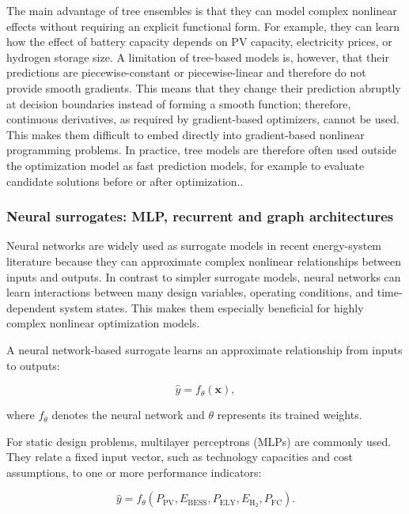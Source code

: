 \documentclass[final,5p,times,twocolumn]{elsarticle}
\begin{document}
The main advantage of tree ensembles is that they can model complex
nonlinear effects without requiring an explicit functional form. For
example, they can learn how the effect of battery capacity depends on PV
capacity, electricity prices, or hydrogen storage size. A limitation of
tree-based models is, however, that their predictions are
piecewise-constant or piecewise-linear and therefore do not provide
smooth gradients. This means that they change their prediction abruptly
at decision boundaries instead of forming a smooth function; therefore,
continuous derivatives, as required by gradient-based optimizers, cannot
be used. This makes them difficult to embed directly into gradient-based
nonlinear programming problems. In practice, tree models are therefore
often used outside the optimization model as fast prediction models, for
example to evaluate candidate solutions before or after
optimization.\cite{Ren2024,Lin2023,Pang2023,Wang20211767}.

\subsubsection{Neural surrogates: MLP, recurrent and graph architectures}
\label{sec:tax:nn}

Neural networks are widely used as surrogate models in recent
energy-system literature because they can approximate complex nonlinear
relationships between inputs and outputs. In contrast to simpler
surrogate models, neural networks can learn interactions between many
design variables, operating conditions, and time-dependent system
states. This makes them especially beneficial for highly complex
nonlinear optimization models.

A neural network-based surrogate learns an approximate relationship from
inputs to outputs:

$$\begin{equation}
 \hat{y} = f_{\theta}(\mathbf{x}),
\end{equation}$$

where $f_{\theta}$ denotes the neural network and $\theta$ represents
its trained weights.

For static design problems, multilayer perceptrons (MLPs) are commonly
used. They relate a fixed input vector, such as technology capacities
and cost assumptions, to one or more performance indicators:

$$\begin{equation}
 \hat{y} = f_{\theta} \left( P_{\mathrm{PV}}, E_{\mathrm{BESS}}, P_{\mathrm{ELY}}, E_{\mathrm{H_2}}, P_{\mathrm{FC}} \right).
\end{equation}$$
\end{document}
